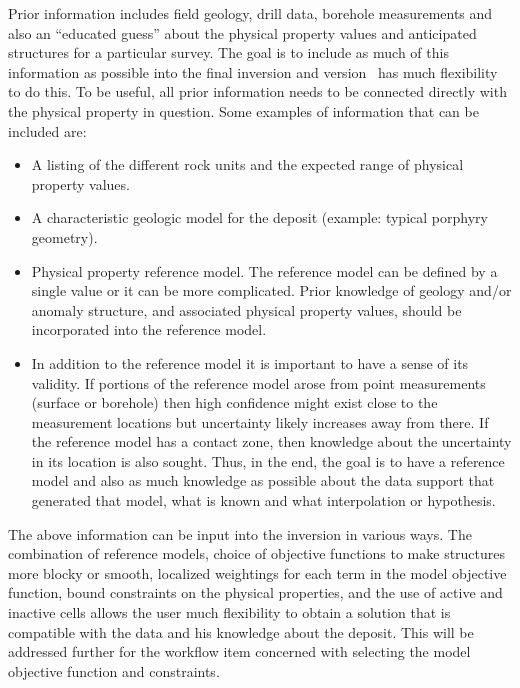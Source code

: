 Prior information includes field geology, drill data, borehole measurements and also an ``educated guess'' about the physical property values and anticipated structures for a particular survey. The goal is to include as much of this information as possible into the final inversion and version ~\version has much flexibility to do this. To be useful, all prior information needs to be connected directly with the physical property in question. Some examples of information that can be included are:
%
\begin{itemize}
\item A listing of the different rock units and the expected range of physical property values.
\item A characteristic geologic model for the deposit (example: typical porphyry geometry).
\item Physical property reference model. The reference model can be defined by a single value or it can be more complicated. Prior knowledge of geology and/or anomaly structure, and associated physical property values, should be incorporated into the reference model.
\item In addition to the reference model it is important to have a sense of its validity. If portions of the reference model arose from point measurements (surface or borehole) then high confidence might exist close to the measurement locations but uncertainty likely increases away from there. If the reference model has a contact zone, then knowledge about the uncertainty in its location is also sought. Thus, in the end, the goal is to have a reference model and also as much knowledge as possible about the data support that generated that model, what is known and what interpolation or hypothesis.
\end{itemize}
%
The above information can be input into the inversion in various ways. The combination of reference models, choice of objective functions to make structures more blocky or smooth, localized weightings for each term in the model objective function, bound constraints on the physical properties, and the use of active and inactive cells allows the user much flexibility to obtain a solution that is compatible with the data and his knowledge about the deposit. This will be addressed further for the workflow item concerned with selecting the model objective function and constraints.

